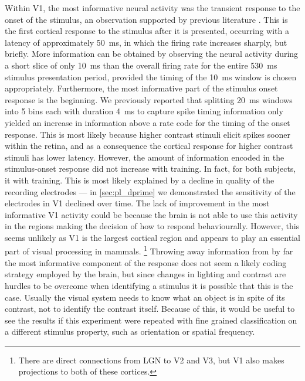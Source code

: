 Within \ac{V1}, the most informative neural activity was the transient response to the onset of the stimulus, an observation supported by previous literature \citep{Muller2001}.
This is the first cortical response to the stimulus after it is presented, occurring with a latency of approximately \SI{50}{\milli\second}, in which the firing rate increases sharply, but briefly.
More information can be obtained by observing the neural activity during a short slice of only \SI{10}{\milli\second} than the overall firing rate for the entire \SI{530}{\milli\second} stimulus presentation period, provided the timing of the \SI{10}{\milli\second} window is chosen appropriately.
Furthermore, the most informative part of the stimulus onset response is the beginning.
We previously reported \citep{Lowe2012} that splitting \SI{20}{\milli\second} windows into \num{5} bins each with duration \SI{4}{\milli\second} to capture spike timing information only yielded an increase in information above a rate code for the timing of the onset response.
This is most likely because higher contrast stimuli elicit spikes sooner within the retina, and as a consequence the cortical response for higher contrast stimuli has lower latency.
However, the amount of information encoded in the stimulus-onset response did not increase with training.
In fact, for both subjects, it  with training.
This is most likely explained by a decline in quality of the recording electrodes --- in \autoref{sec:pl_dprime} we demonstrated the sensitivity of the electrodes in \ac{V1} declined over time.
The lack of improvement in the most informative \ac{V1} activity could be because the brain is not able to use this activity in the regions making the decision of how to respond behaviourally.
However, this seems unlikely as \ac{V1} is the largest cortical region and appears to play an essential part of visual processing in mammals.%
\footnote{There are direct connections from \ac{LGN} to \ac{V2} and \ac{V3}, but \ac{V1} also makes projections to both of these cortices.}
Throwing away information from by far the most informative component of the response does not seem a likely coding strategy employed by the brain, but since changes in lighting and contrast are hurdles to be overcome when identifying a stimulus it is possible that this is the case.
Usually the visual system needs to know what an object is in spite of its contrast, not to identify the contrast itself.
Because of this, it would be useful to see the results if this experiment were repeated with fine grained classification on a different stimulus property, such as orientation or spatial frequency.

